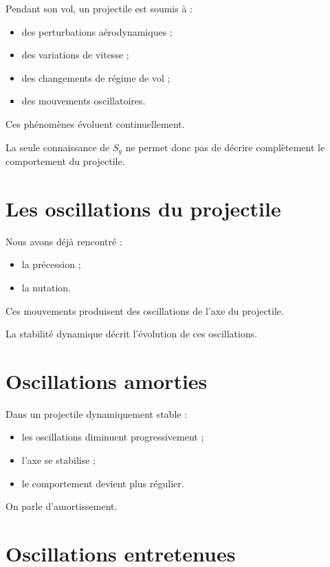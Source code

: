 Pendant son vol, un projectile est soumis à :

\begin{itemize}
    \item des perturbations aérodynamiques ;
    \item des variations de vitesse ;
    \item des changements de régime de vol ;
    \item des mouvements oscillatoires.
\end{itemize}

Ces phénomènes évoluent continuellement.

La seule connaissance de $S_g$ ne permet donc pas de décrire complètement
le comportement du projectile.

\section{Les oscillations du projectile}

Nous avons déjà rencontré :

\begin{itemize}
    \item la précession ;
    \item la nutation.
\end{itemize}

Ces mouvements produisent des oscillations de l'axe du projectile.

La stabilité dynamique décrit l'évolution de ces oscillations.

\section{Oscillations amorties}

Dans un projectile dynamiquement stable :

\begin{itemize}
    \item les oscillations diminuent progressivement ;
    \item l'axe se stabilise ;
    \item le comportement devient plus régulier.
\end{itemize}

On parle d'amortissement.

\section{Oscillations entretenues}

